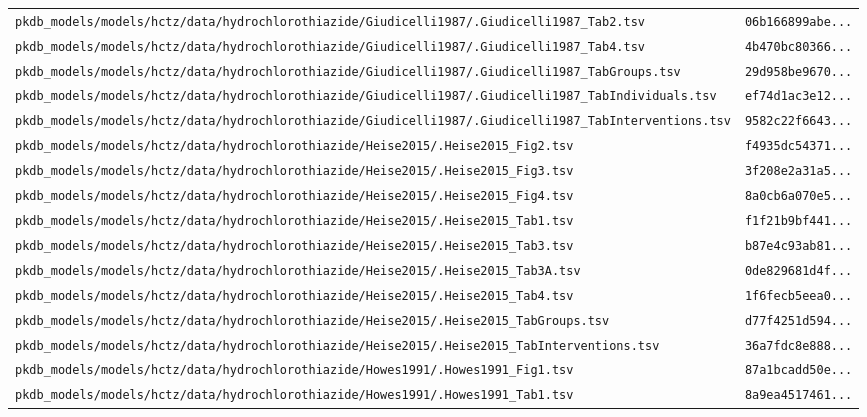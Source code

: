 \begin{longtable}{ll}
\texttt{pkdb\_models/models/hctz/data/hydrochlorothiazide/Giudicelli1987/.Giudicelli1987\_Tab2.tsv} & \texttt{06b166899abe...} \\
\texttt{pkdb\_models/models/hctz/data/hydrochlorothiazide/Giudicelli1987/.Giudicelli1987\_Tab4.tsv} & \texttt{4b470bc80366...} \\
\texttt{pkdb\_models/models/hctz/data/hydrochlorothiazide/Giudicelli1987/.Giudicelli1987\_TabGroups.tsv} & \texttt{29d958be9670...} \\
\texttt{pkdb\_models/models/hctz/data/hydrochlorothiazide/Giudicelli1987/.Giudicelli1987\_TabIndividuals.tsv} & \texttt{ef74d1ac3e12...} \\
\texttt{pkdb\_models/models/hctz/data/hydrochlorothiazide/Giudicelli1987/.Giudicelli1987\_TabInterventions.tsv} & \texttt{9582c22f6643...} \\
\texttt{pkdb\_models/models/hctz/data/hydrochlorothiazide/Heise2015/.Heise2015\_Fig2.tsv} & \texttt{f4935dc54371...} \\
\texttt{pkdb\_models/models/hctz/data/hydrochlorothiazide/Heise2015/.Heise2015\_Fig3.tsv} & \texttt{3f208e2a31a5...} \\
\texttt{pkdb\_models/models/hctz/data/hydrochlorothiazide/Heise2015/.Heise2015\_Fig4.tsv} & \texttt{8a0cb6a070e5...} \\
\texttt{pkdb\_models/models/hctz/data/hydrochlorothiazide/Heise2015/.Heise2015\_Tab1.tsv} & \texttt{f1f21b9bf441...} \\
\texttt{pkdb\_models/models/hctz/data/hydrochlorothiazide/Heise2015/.Heise2015\_Tab3.tsv} & \texttt{b87e4c93ab81...} \\
\texttt{pkdb\_models/models/hctz/data/hydrochlorothiazide/Heise2015/.Heise2015\_Tab3A.tsv} & \texttt{0de829681d4f...} \\
\texttt{pkdb\_models/models/hctz/data/hydrochlorothiazide/Heise2015/.Heise2015\_Tab4.tsv} & \texttt{1f6fecb5eea0...} \\
\texttt{pkdb\_models/models/hctz/data/hydrochlorothiazide/Heise2015/.Heise2015\_TabGroups.tsv} & \texttt{d77f4251d594...} \\
\texttt{pkdb\_models/models/hctz/data/hydrochlorothiazide/Heise2015/.Heise2015\_TabInterventions.tsv} & \texttt{36a7fdc8e888...} \\
\texttt{pkdb\_models/models/hctz/data/hydrochlorothiazide/Howes1991/.Howes1991\_Fig1.tsv} & \texttt{87a1bcadd50e...} \\
\texttt{pkdb\_models/models/hctz/data/hydrochlorothiazide/Howes1991/.Howes1991\_Tab1.tsv} & \texttt{8a9ea4517461...} \\

\end{longtable}
